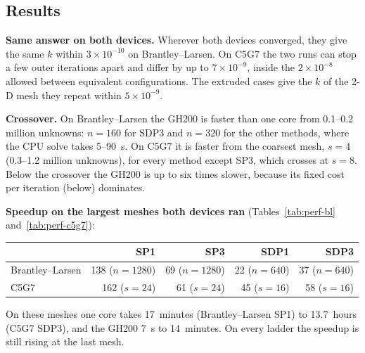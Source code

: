 \subsection{Results}

\textbf{Same answer on both devices.} Wherever both devices converged, they
give the same $k$ within $3 \times 10^{-10}$ on Brantley--Larsen. On C5G7 the
two runs can stop a few outer iterations apart and differ by up to
$7 \times 10^{-9}$, inside the $2 \times 10^{-8}$ allowed between equivalent
configurations. The extruded cases give the $k$ of the 2-D mesh they repeat
within $5 \times 10^{-9}$.

\textbf{Crossover.} On Brantley--Larsen the GH200 is faster than one core
from 0.1--0.2 million unknowns: $n = 160$ for SDP3 and $n = 320$ for the
other methods, where the CPU solve takes 5--90~s. On C5G7 it is faster from
the coarsest mesh, $s = 4$ (0.3--1.2 million unknowns), for every method
except SP3, which crosses at $s = 8$. Below the crossover the GH200 is up to
six times slower, because its fixed cost per iteration (below) dominates.

\textbf{Speedup on the largest meshes both devices ran}
(Tables~\ref{tab:perf-bl} and~\ref{tab:perf-c5g7}):

\begin{center}
\begin{tabular}{lrrrr}
\hline
 & SP1 & SP3 & SDP1 & SDP3 \\
\hline
Brantley--Larsen & 138 ($n = 1280$) & 69 ($n = 1280$) & 22 ($n = 640$) & 37 ($n = 640$) \\
C5G7             & 162 ($s = 24$)   & 61 ($s = 24$)   & 45 ($s = 16$)  & 58 ($s = 16$) \\
\hline
\end{tabular}
\end{center}

\noindent On these meshes one core takes 17~minutes (Brantley--Larsen SP1)
to 13.7~hours (C5G7 SDP3), and the GH200 7~s to 14~minutes. On every ladder
the speedup is still rising at the last mesh.

